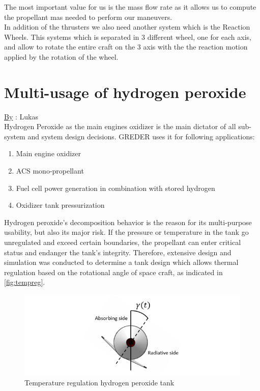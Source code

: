 The most important value for us is the mass flow rate as it allows us to compute the propellant mas needed to perform our maneuvers. \\


In addition of the thrusters we also need another system which is the Reaction Wheels. This systems which is separated in 3 different wheel, one for each axis, and allow to rotate the entire craft on the 3 axis with the the reaction motion applied by the rotation of the wheel.

\section{Multi-usage of hydrogen peroxide}
\qquad \underline{By} : Lukas\\

\label{sec:10-3}
Hydrogen Peroxide as the main engines oxidizer is the main dictator of all sub-system and system design decisions. GREDER uses it for following applications:
\begin{enumerate}
	\item	Main engine oxidizer
	\item	ACS mono-propellant
	\item	Fuel cell power generation in combination with stored hydrogen
	\item	Oxidizer tank pressurization
\end{enumerate}

Hydrogen peroxide’s decomposition behavior is the reason for its multi-purpose usability, but also its major risk. If the pressure or temperature in the tank go unregulated and exceed certain boundaries, the propellant can enter critical status and endanger the tank’s integrity. Therefore, extensive design and simulation was conducted to determine a tank design which allows thermal regulation based on the rotational angle of space craft, as indicated in \autoref{fig:tempreg}. 

\begin{figure}[H]
	\centering
	\includegraphics[width=\linewidth]{tempreg}
	\caption{Temperature regulation hydrogen peroxide tank}\label{fig:tempreg}
\end{figure}

